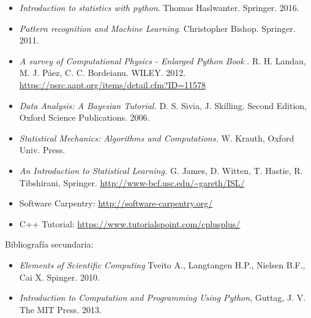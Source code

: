 \documentclass[letterpaper,10pt,onecolumn]{article}
\begin{document}
\begin{itemize}

\item
\textit{Introduction to statistics with python}.
Thomas Haslwanter.  Springer. 2016.

\item 
\textit{Pattern recognition and Machine Learning}.
Christopher Bishop. Springer. 2011.

\item
\textit{A survey of Computational Physics - Enlarged Python Book}
. R. H. Landau, M. J. P\'aez, C. C. Bordeianu. WILEY. 2012.
\url{https://psrc.aapt.org/items/detail.cfm?ID=11578}

\item
\textit{Data Analysis: A Bayesian Tutorial.} D. S. Sivia,
J. Skilling. Second Edition, Oxford Science Publications. 2006.

\item 
\textit{Statistical Mechanics: Algorithms and Computations.}
W. Krauth, Oxford Univ. Press. 

\item
\textit{An Introduction to Statistical Learning.} G. James, D. Witten,
T. Hastie, R. Tibshirani,
Springer. \url{http://www-bcf.usc.edu/~gareth/ISL/} 


\item Software Carpentry: \url{http://software-carpentry.org/}
\item C++ Tutorial: \url{https://www.tutorialspoint.com/cplusplus/}
\end{itemize}

\noindent\normalsize Bibliograf\'ia secundaria:
\begin{itemize}
\item
\textit{Elements of Scientific Computing}
Tveito A., Langtangen H.P., Nielsen B.F., Cai X. Spinger. 2010.


\item 
\textit{Introduction to Computation and Programming Using Python},
Guttag, J. V. The MIT Press. 2013.

\end{itemize}
\end{document}
